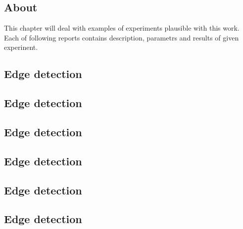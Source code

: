 \subsection{About}
This chapter will deal with examples of experiments plausible with this work. 
Each of following reports contains description, parametrs and results of given experinent.
\newpage
\subsection{Edge detection}

\newpage
\subsection{Edge detection}

\newpage
\subsection{Edge detection}

\newpage
\subsection{Edge detection}

\newpage
\subsection{Edge detection}

\newpage
\subsection{Edge detection}

\newpage